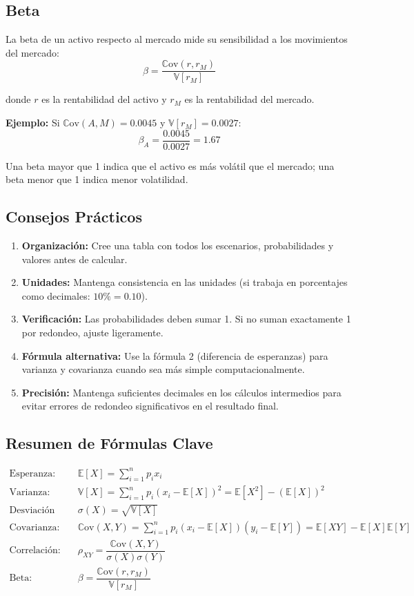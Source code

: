 \documentclass[12pt,a4paper]{article}
\newcommand{\E}{\mathbb{E}}
\newcommand{\V}{\mathbb{V}}
\newcommand{\Cov}{\mathbb{C}\text{ov}}
\begin{document}
\subsection*{Beta}

La beta de un activo respecto al mercado mide su sensibilidad a los movimientos del mercado:
\[
\beta = \frac{\Cov(r, r_M)}{\V[r_M]}
\]

donde $r$ es la rentabilidad del activo y $r_M$ es la rentabilidad del mercado.

\textbf{Ejemplo:} Si $\Cov(A, M) = 0.0045$ y $\V[r_M] = 0.0027$:
\[
\beta_A = \frac{0.0045}{0.0027} = 1.67
\]

Una beta mayor que 1 indica que el activo es más volátil que el mercado; una beta menor que 1 indica menor volatilidad.

\subsection*{Consejos Prácticos}

\begin{enumerate}
\item \textbf{Organización:} Cree una tabla con todos los escenarios, probabilidades y valores antes de calcular.
\item \textbf{Unidades:} Mantenga consistencia en las unidades (si trabaja en porcentajes como decimales: $10\% = 0.10$).
\item \textbf{Verificación:} Las probabilidades deben sumar 1. Si no suman exactamente 1 por redondeo, ajuste ligeramente.
\item \textbf{Fórmula alternativa:} Use la fórmula 2 (diferencia de esperanzas) para varianza y covarianza cuando sea más simple computacionalmente.
\item \textbf{Precisión:} Mantenga suficientes decimales en los cálculos intermedios para evitar errores de redondeo significativos en el resultado final.
\end{enumerate}

\subsection*{Resumen de Fórmulas Clave}

\begin{align*}
\text{Esperanza:} \quad & \E[X] = \sum_{i=1}^{n} p_i x_i\\[4pt]
\text{Varianza:} \quad & \V[X] = \sum_{i=1}^{n} p_i (x_i - \E[X])^2 = \E[X^2] - (\E[X])^2\\[4pt]
\text{Desviación estándar:} \quad & \sigma(X) = \sqrt{\V[X]}\\[4pt]
\text{Covarianza:} \quad & \Cov(X,Y) = \sum_{i=1}^{n} p_i (x_i - \E[X])(y_i - \E[Y]) = \E[XY] - \E[X]\E[Y]\\[4pt]
\text{Correlación:} \quad & \rho_{XY} = \dfrac{\Cov(X,Y)}{\sigma(X) \sigma(Y)}\\[4pt]
\text{Beta:} \quad & \beta = \dfrac{\Cov(r, r_M)}{\V[r_M]}
\end{align*}
\end{document}
